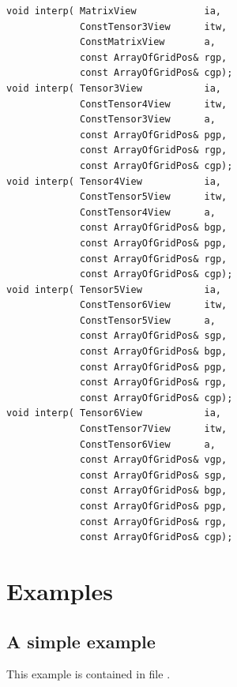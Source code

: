 {\small
\begin{verbatim}
void interp( MatrixView            ia,
             ConstTensor3View      itw,
             ConstMatrixView       a,   
             const ArrayOfGridPos& rgp,
             const ArrayOfGridPos& cgp);
void interp( Tensor3View           ia,
             ConstTensor4View      itw,
             ConstTensor3View      a,   
             const ArrayOfGridPos& pgp,
             const ArrayOfGridPos& rgp,
             const ArrayOfGridPos& cgp);
void interp( Tensor4View           ia,
             ConstTensor5View      itw,
             ConstTensor4View      a,   
             const ArrayOfGridPos& bgp,
             const ArrayOfGridPos& pgp,
             const ArrayOfGridPos& rgp,
             const ArrayOfGridPos& cgp);
void interp( Tensor5View           ia,
             ConstTensor6View      itw,
             ConstTensor5View      a,   
             const ArrayOfGridPos& sgp,
             const ArrayOfGridPos& bgp,
             const ArrayOfGridPos& pgp,
             const ArrayOfGridPos& rgp,
             const ArrayOfGridPos& cgp);
void interp( Tensor6View           ia,
             ConstTensor7View      itw,
             ConstTensor6View      a,   
             const ArrayOfGridPos& vgp,
             const ArrayOfGridPos& sgp,
             const ArrayOfGridPos& bgp,
             const ArrayOfGridPos& pgp,
             const ArrayOfGridPos& rgp,
             const ArrayOfGridPos& cgp);
\end{verbatim}
}

\section{Examples}

\subsection{A simple example}

This example is contained in file .

